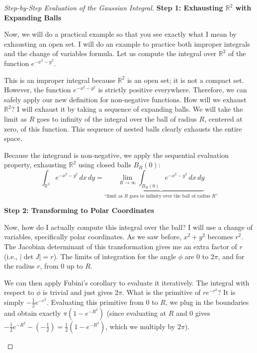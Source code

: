 \begin{proof}[Step-by-Step Evaluation of the Gaussian Integral]

\textbf{Step 1: Exhausting $\mathbb{R}^2$ with Expanding Balls}
\begin{spoken-clean}[16:58 - 19:22]
Now, we will do a practical example so that you see exactly what I mean by exhausting an open set. I will do an example to practice both improper integrals and the change of variables formula. Let us compute the integral over $\mathbb{R}^2$ of the function $e^{-x^2 - y^2}$. 

This is an improper integral because $\mathbb{R}^2$ is an open set; it is not a compact set. However, the function $e^{-x^2 - y^2}$ is strictly positive everywhere. Therefore, we can safely apply our new definition for non-negative functions. How will we exhaust $\mathbb{R}^2$? I will exhaust it by taking a sequence of expanding balls. We will take the limit as $R$ goes to infinity of the integral over the ball of radius $R$, centered at zero, of this function. This sequence of nested balls clearly exhausts the entire space.
\end{spoken-clean}

\begin{math-stroke}
Because the integrand is non-negative, we apply the sequential evaluation property, exhausting $\mathbb{R}^2$ using closed balls $B_R(0)$:
\[
\int_{\mathbb{R}^2} e^{-x^2-y^2} \, dx \, dy = \underbrace{\lim_{R \to \infty} \int_{B_R(0)} e^{-x^2-y^2} \, dx \, dy}_{\text{``limit as } R \text{ goes to infinity over the ball of radius } R \text{''}}
\]
\end{math-stroke}

\textbf{Step 2: Transforming to Polar Coordinates}
\begin{spoken-clean}[19:22 - 24:00]
Now, how do I actually compute this integral over the ball? I will use a change of variables, specifically polar coordinates. As we saw before, $x^2 + y^2$ becomes $r^2$. The Jacobian determinant of this transformation gives me an extra factor of $r$ (i.e., $|\det J| = r$). The limits of integration for the angle $\phi$ are $0$ to $2\pi$, and for the radius $r$, from $0$ up to $R$. 

We can then apply Fubini's corollary to evaluate it iteratively. The integral with respect to $\phi$ is trivial and just gives $2\pi$. What is the primitive of $r e^{-r^2}$? It is simply $-\frac{1}{2} e^{-r^2}$. Evaluating this primitive from $0$ to $R$, we plug in the boundaries and obtain exactly $\pi(1 - e^{-R^2})$ (since evaluating at $R$ and $0$ gives $-\frac{1}{2}e^{-R^2} - (-\frac{1}{2}) = \frac{1}{2}(1 - e^{-R^2})$, which we multiply by $2\pi$).
\end{spoken-clean}


\end{proof}
